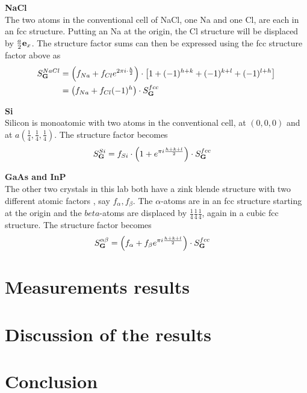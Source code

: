 \documentclass[a4paper,twoside=false,abstract=false,numbers=noenddot,
titlepage=false,headings=small,parskip=half,version=last]{scrartcl}
\begin{document}
\textbf{NaCl}\\
The two atoms in the conventional cell of NaCl, one Na and one Cl, are each in an fcc structure. Putting an Na at the origin, the Cl structure will be displaced by $\frac{a}{2}\bold{e}_x$. The structure factor sums can then be expressed using the fcc structure factor above as
\begin{align}
S^{NaCl}_{\bold{G}} &= \left( f_{Na} + f_{Cl}e^{2\pi i\cdot \frac{h}{2}} \right) \cdot \left[ 1 + (-1)^{h+k} + (-1)^{k+l} + (-1)^{l+h}\right]\\
&= \left( f_{Na} + f_{Cl}(-1)^{h} \right) \cdot S^{fcc}_{\bold{G}}
\end{align}\label{naclstructure}

\textbf{Si}\\
Silicon is monoatomic with two atoms in the conventional cell, at $(0,0,0)$ and at $a(\frac{1}{4},\frac{1}{4},\frac{1}{4})$. The structure factor becomes
\begin{align}
S^{Si}_{\bold{G}} &= f_{Si}\cdot \left( 1 + e^{\pi i \frac{h+k+l}{2}} \right) \cdot S^{fcc}_{\bold{G}}\label{sistructure}
\end{align}

\textbf{GaAs and InP}\\
The other two crystals in this lab both have a zink blende structure with two different atomic factors , say $f_\alpha,f_\beta$. The $\alpha$-atoms are in an fcc structure starting at the origin and the $beta$-atoms are displaced by $\frac{1}{4}\frac{1}{4}\frac{1}{4}$, again in a cubic fcc structure. The structure factor becomes
\begin{align}
S^{\alpha\beta}_{\bold{G}} &= \left( f_\alpha + f_\beta e^{\pi i \frac{h+k+l}{2}} \right) \cdot S^{fcc}_{\bold{G}}\label{zincblendestructure}
\end{align}

\section{Measurements results}

\section{Discussion of the results}

\section{Conclusion}
\end{document}
